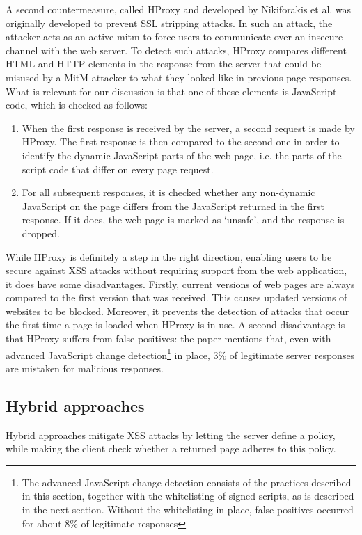 A second countermeasure, called HProxy and developed by Nikiforakis et al. \cite{Nikiforakis2010a} was originally developed to prevent SSL stripping attacks. In such an attack, the attacker acts as an active \gls{mitm} to force users to communicate over an insecure channel with the web server. To detect such attacks, HProxy compares different HTML and HTTP elements in the response from the server that could be misused by a MitM attacker to what they looked like in previous page responses. What is relevant for our discussion is that one of these elements is JavaScript code, which is checked as follows:
\begin{enumerate}
	\item When the first response is received by the server, a second request is made by HProxy. The first response is then compared to the second one in order to identify the dynamic JavaScript parts of the web page, i.e. the parts of the script code that differ on every page request.
	\item For all subsequent responses, it is checked whether any non-dynamic JavaScript on the page differs from the JavaScript returned in the first response. If it does, the web page is marked as `unsafe', and the response is dropped.
\end{enumerate}
While HProxy is definitely a step in the right direction, enabling users to be secure against XSS attacks without requiring support from the web application, it does have some disadvantages. Firstly, current versions of web pages are always compared to the first version that was received. This causes updated versions of websites to be blocked. Moreover, it prevents the detection of attacks that occur the first time a page is loaded when HProxy is in use. A second disadvantage is that HProxy suffers from false positives: the paper mentions that, even with advanced JavaScript change detection\footnote{The advanced JavaScript change detection consists of the practices described in this section, together with the whitelisting of signed scripts, as is described in the next section. Without the whitelisting in place, false positives occurred for about 8\% of legitimate responses} in place, 3\% of legitimate server responses are mistaken for malicious responses.

\subsection{Hybrid approaches}

Hybrid approaches mitigate XSS attacks by letting the server define a policy, while making the client check whether a returned page adheres to this policy.

